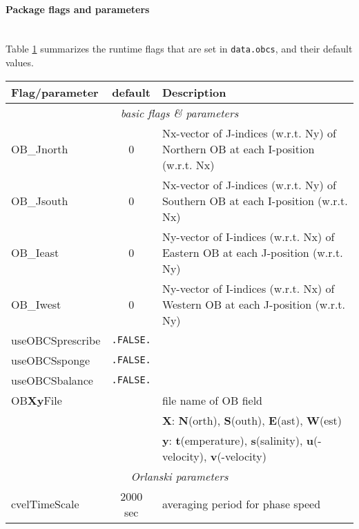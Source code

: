 \paragraph{Package flags and parameters}
~ \\
%
Table \ref{tab:pkg:obcs:runtime_flags} summarizes the
runtime flags that are set in \texttt{data.obcs}, and
their default values.

\begin{table}[h!]
\centering
  \label{tab:pkg:obcs:runtime_flags}
  {\footnotesize
    \begin{tabular}{|l|c|l|}
      \hline 
      \textbf{Flag/parameter} & \textbf{default} &  \textbf{Description}  \\
      \hline \hline
         \multicolumn{3}{|c|}{\textit{basic flags \& parameters} } \\
         \hline
        OB\_Jnorth & 0 & 
           Nx-vector of J-indices (w.r.t. Ny) of Northern OB
           at each I-position (w.r.t. Nx) \\
        OB\_Jsouth & 0 & 
           Nx-vector of J-indices (w.r.t. Ny) of Southern OB
           at each I-position (w.r.t. Nx) \\
        OB\_Ieast & 0 & 
           Ny-vector of I-indices (w.r.t. Nx) of Eastern OB
           at each J-position (w.r.t. Ny) \\
        OB\_Iwest & 0 & 
           Ny-vector of I-indices (w.r.t. Nx) of Western OB
           at each J-position (w.r.t. Ny) \\
        useOBCSprescribe & \texttt{.FALSE.} & 
           ~ \\
        useOBCSsponge & \texttt{.FALSE.} & 
           ~ \\
        useOBCSbalance & \texttt{.FALSE.} & 
           ~ \\
        OB\textbf{X}\textbf{y}File & ~ & 
           file name of OB field \\
        ~ & ~ & 
           \textbf{X}: \textbf{N}(orth), \textbf{S}(outh), 
                       \textbf{E}(ast), \textbf{W}(est) \\
        ~ & ~ & 
           \textbf{y}: \textbf{t}(emperature), \textbf{s}(salinity), 
           \textbf{u}(-velocity), \textbf{v}(-velocity) \\
      \hline
      \multicolumn{3}{|c|}{\textit{Orlanski parameters} } \\
      \hline
        cvelTimeScale & 2000 sec & 
           averaging period for phase speed \\

\end{tabular}}
\end{table}
